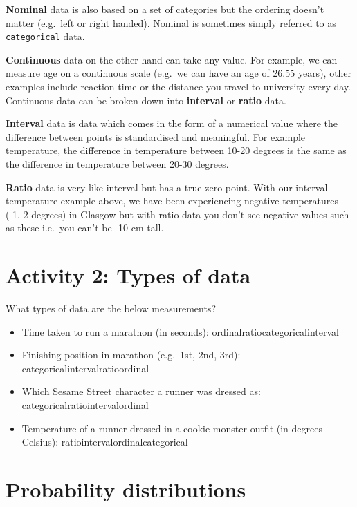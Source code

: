 \documentclass[
  oneside]{book}
\providecommand{\tightlist}{%
  \setlength{\itemsep}{0pt}\setlength{\parskip}{0pt}}
\begin{document}
\textbf{Nominal} data is also based on a set of categories but the ordering doesn't matter (e.g.~left or right handed). Nominal is sometimes simply referred to as \texttt{categorical} data.

\textbf{Continuous} data on the other hand can take any value. For example, we can measure age on a continuous scale (e.g.~we can have an age of 26.55 years), other examples include reaction time or the distance you travel to university every day. Continuous data can be broken down into \textbf{interval} or \textbf{ratio} data.

\textbf{Interval} data is data which comes in the form of a numerical value where the difference between points is standardised and meaningful. For example temperature, the difference in temperature between 10-20 degrees is the same as the difference in temperature between 20-30 degrees.

\textbf{Ratio} data is very like interval but has a true zero point. With our interval temperature example above, we have been experiencing negative temperatures (-1,-2 degrees) in Glasgow but with ratio data you don't see negative values such as these i.e.~you can't be -10 cm tall.

\hypertarget{activity-2-types-of-data}{%
\section{Activity 2: Types of data}\label{activity-2-types-of-data}}

What types of data are the below measurements?

\begin{itemize}
\tightlist
\item
  Time taken to run a marathon (in seconds): ordinalratiocategoricalinterval
\item
  Finishing position in marathon (e.g.~1st, 2nd, 3rd): categoricalintervalratioordinal
\item
  Which Sesame Street character a runner was dressed as: categoricalratiointervalordinal
\item
  Temperature of a runner dressed in a cookie monster outfit (in degrees Celsius): ratiointervalordinalcategorical
\end{itemize}

\hypertarget{probability-distributions}{%
\section{Probability distributions}\label{probability-distributions}}
\end{document}
